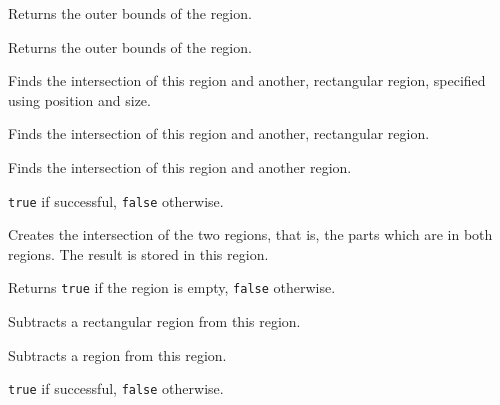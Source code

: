 \label{wxregiongetbox}


Returns the outer bounds of the region.


Returns the outer bounds of the region.

\label{wxregionintersect}


Finds the intersection of this region and another, rectangular region, specified using position and size.


Finds the intersection of this region and another, rectangular region.


Finds the intersection of this region and another region.


{\tt true} if successful, {\tt false} otherwise.


Creates the intersection of the two regions, that is, the parts which are in both regions. The result
is stored in this region.

\label{wxregionisempty}


Returns {\tt true} if the region is empty, {\tt false} otherwise.

\label{wxregionsubtract}


Subtracts a rectangular region from this region.


Subtracts a region from this region.


{\tt true} if successful, {\tt false} otherwise.



